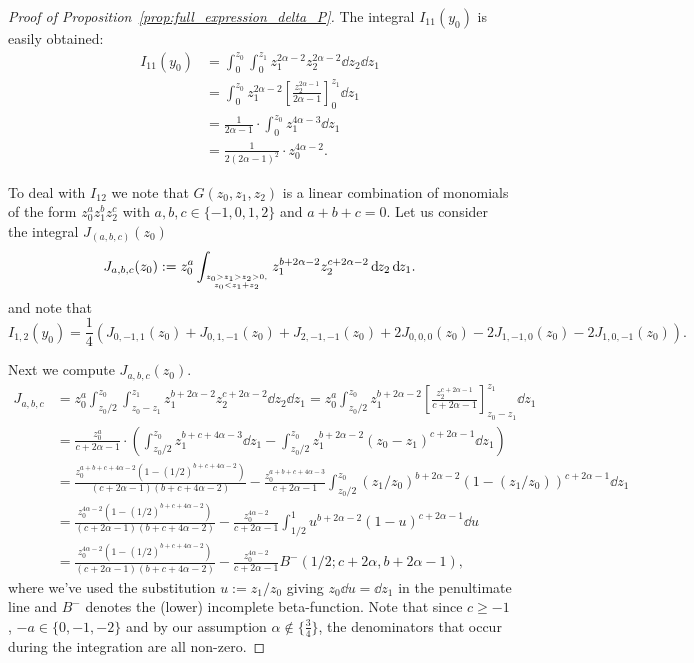 \begin{proof}[Proof of Proposition~\ref{prop:full_expression_delta_P}]
The integral $I_{11}(y_0)$ is easily obtained:
\begin{align*}
	I_{11}(y_0) &= \int_0^{z_0} \int_0^{z_1} z_1^{2\alpha-2} z_2^{2\alpha-2} {\dd}z_2{\dd}z_1\\
	&= \int_0^{z_0} z_1^{2\alpha-2} \left[ \frac{z_2^{2\alpha-1}}{2\alpha-1} \right]_0^{z_1} {\dd}z_1\\
	&= \frac{1}{2\alpha-1} \cdot \int_0^{z_0} z_1^{4\alpha-3} {\dd}z_1 \\
	&= \frac{1}{2(2\alpha-1)^2} \cdot z_0^{4\alpha-2}.
\end{align*}

To deal with $I_{12}$ we note that $G(z_0,z_1,z_2)$ is a linear combination of monomials of the form $z_0^az_1^bz_2^c$ with 
$a,b,c \in \{-1,0,1,2\}$ and $a+b+c=0$. Let us consider the integral $J_(a,b,c)(z_0)$
\begin{equation}\label{eq:def_Delta_P_computation_int_J_1}
	J_{a,b,c}(z_0) := z_0^a \int_{{z_0>z_1>z_2>0,}\atop{z_0 < z_1+z_2}} z_1^{b+2\alpha-2} z_2^{c+2\alpha-2} {\operatorname{\, \mathrm{d}\hspace{-1pt}}}z_2{\operatorname{\, \mathrm{d}\hspace{-1pt}}}z_1.
\end{equation}
and note that
\begin{equation}\label{eq:Delta_P_computation_I12_with_J}
	I_{1,2}(y_0) = \frac{1}{4} (J_{0,-1,1}(z_0)+J_{0,1,-1}(z_0)+J_{2,-1,-1}(z_0)+2J_{0,0,0}(z_0)-2J_{1,-1,0}(z_0)-2J_{1,0,-1}(z_0)).
\end{equation}

Next we compute $J_{a,b,c}(z_0)$.
\begin{align*}
	J_{a,b,c} 
	&= z_0^a \int_{z_0/2}^{z_0}\int_{z_0-z_1}^{z_1} z_1^{b+2\alpha-2} z_2^{c+2\alpha-2} {\dd}z_2{\dd}z_1
		= z_0^a \int_{z_0/2}^{z_0} z_1^{b+2\alpha-2} \left[ \frac{ z_2^{c+2\alpha-1} }{ c+2\alpha-1 } \right]_{z_0-z_1}^{z_1} \dd z_1\\
	&= \frac{z_0^a}{c+2\alpha-1} \cdot \left( \int_{z_0/2}^{z_0} z_1^{b+c+4\alpha-3} {\dd}z_1
	   - \int_{z_0/2}^{z_0} z_1^{b+2\alpha-2} (z_0-z_1)^{c+2\alpha-1} {\dd}z_1 \right) \\
	&= \frac{z_0^{a+b+c+4\alpha-2}(1-(1/2)^{b+c+4\alpha-2})}{(c+2\alpha-1)(b+c+4\alpha-2)} 
		- \frac{z_0^{a+b+c+4\alpha-3}}{c+2\alpha-1} \int_{z_0/2}^{z_0}  \left(z_1/z_0\right)^{b+2\alpha-2} 
	    \left(1-(z_1/z_0)\right)^{c+2\alpha-1} {\dd}z_1\\
	&= \frac{z_0^{4\alpha-2}(1-(1/2)^{b+c+4\alpha-2})}{(c+2\alpha-1)(b+c+4\alpha-2)} 
		- \frac{z_0^{4\alpha-2}}{c+2\alpha-1}
	   \int_{1/2}^1  u^{b+2\alpha-2}(1-u)^{c+2\alpha-1} {\dd} u \\
	&= \frac{z_0^{4\alpha-2}(1-(1/2)^{b+c+4\alpha-2})}{(c+2\alpha-1)(b+c+4\alpha-2)} 
		- \frac{z_0^{4\alpha-2}}{c+2\alpha-1} B^-(1/2;c+2\alpha, b+2\alpha-1),
\end{align*}
where we've used the substitution $u := z_1/z_0$ giving $z_0 {\dd} u = {\dd} z_1$ in the penultimate line and
$B^-$ denotes the (lower) incomplete beta-function. Note that since $c \geq -1$, $-a \in \{0,-1,-2\}$ and by our assumption $\alpha \not \in \{\frac{3}{4}\}$, the denominators that occur during the integration are all non-zero.


\end{proof}
